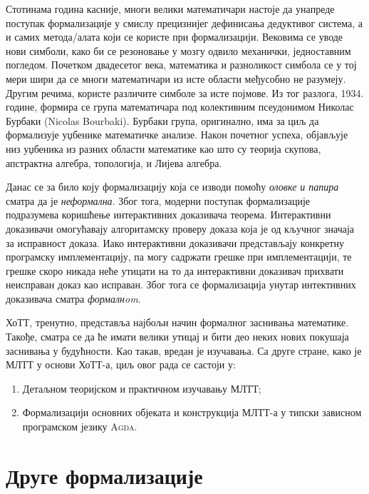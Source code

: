 \documentclass[12pt,oneside]{memoir}
\begin{document}
Стотинама година касније, многи велики математичари настоје да унапреде поступак формализације у смислу прецизнијег дефинисања дедуктивог система, а и самих метода/алата који се користе при формализацији. Вековима се уводе нови симболи, како би се резоновање у мозгу одвило механички, једноставним погледом. Почетком двадесетог века, математика и разноликост симбола се у тој мери шири да се многи математичари из исте области међусобно не разумеју. Другим речима, користе различите симболе за исте појмове. Из тог разлога, 1934. године, формира се група математичара под колективним псеудонимом Николас Бурбаки (Nicolas Bourbaki). Бурбаки група, оригинално, има за циљ да формализује уџбенике математичке анализе. Након почетног успеха, објављује низ уџбеника из разних области математике као што су теорија скупова, апстрактна алгебра, топологија, и Лијева алгебра.

Данас се за било коју формализацију која се изводи помоћу \emph{оловке и папира} сматра да је \emph{неформална}. Због тога, модерни поступак формализације подразумева коришћење интерактивних доказивача теорема. Интерактивни доказивачи омогућавају алгоритамску проверу доказа која је од кључног значаја за исправност доказа. Иако интерактивни доказивачи представљају конкретну програмску имплементацију, па могу садржати грешке при имплементацији, те грешке скоро никада неће утицати на то да интерактивни доказивач прихвати неисправан доказ као исправан. Због тога се формализација унутар интективних доказивача сматра \emph{формалнom}.

ХоТТ, тренутно, представља најбољи начин формалног заснивања математике. Такође, сматра се да ће имати велики утицај и бити део неких нових покушаја заснивања у будућности. Као такав, вредан је изучавања. Са друге стране, како је МЛТТ у основи ХоТТ-а, циљ овог рада се састоји у:
\begin{enumerate}
    \item{Детаљном теоријском и практичном изучавању МЛТТ;}
    \item{Формализацији основних објеката и конструкција МЛТТ-а у типски зависном програмском језику \textsc{Agda}.}
\end{enumerate}

\section{Друге формализације}
\end{document}
